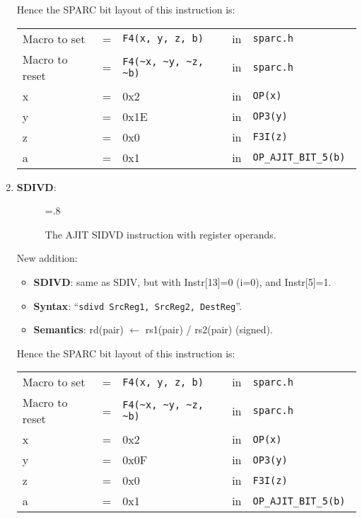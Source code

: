 \begin{enumerate}
  Hence the SPARC bit layout of this instruction is:

  \begin{tabular}[h]{lclcl}
    Macro to set   &=& \verb|F4(x, y, z, b)|     &in& \verb|sparc.h|           \\
    Macro to reset &=& \verb|F4(~x, ~y, ~z, ~b)| &in& \verb|sparc.h|           \\
    x              &=& 0x2                       &in& \verb|OP(x) |            \\
    y              &=& 0x1E                      &in& \verb|OP3(y) |           \\
    z              &=& 0x0                       &in& \verb|F3I(z) |           \\
    a              &=& 0x1                       &in& \verb|OP_AJIT_BIT_5(b) |
  \end{tabular}

\item \textbf{SDIVD}:\\
  \begin{center}
    \begin{figure}[h]
      \centering
      \epsfxsize=.8\linewidth
      \caption{The AJIT SIDVD instruction  with register operands.}
      \label{fig:ajit:sdivd:insn}
    \end{figure}
  \end{center}
  New addition:
  \begin{itemize}
  \item []\textbf{SDIVD}: same as SDIV, but with Instr[13]=0 (i=0), and
    Instr[5]=1.
  \item []\textbf{Syntax}: ``\texttt{sdivd  SrcReg1, SrcReg2, DestReg}''.
  \item []\textbf{Semantics}: rd(pair) $\leftarrow$ rs1(pair) /
    rs2(pair) (signed).
  \end{itemize}

  Hence the SPARC bit layout of this instruction is:

  \begin{tabular}[h]{lclcl}
    Macro to set   &=& \verb|F4(x, y, z, b)|     &in& \verb|sparc.h|           \\
    Macro to reset &=& \verb|F4(~x, ~y, ~z, ~b)| &in& \verb|sparc.h|           \\
    x              &=& 0x2                       &in& \verb|OP(x) |            \\
    y              &=& 0x0F                      &in& \verb|OP3(y) |           \\
    z              &=& 0x0                       &in& \verb|F3I(z) |           \\
    a              &=& 0x1                       &in& \verb|OP_AJIT_BIT_5(b) |
  \end{tabular}


\end{enumerate}
